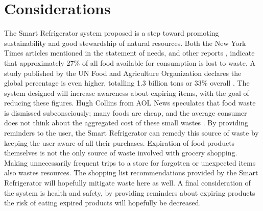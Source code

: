 \documentclass[11pt]{article} %
\begin{document}
\section{Considerations}
The Smart Refrigerator system proposed is a step toward promoting sustainability and good stewardship of natural resources. Both the New York Times articles mentioned in the statement of needs, and other reports \cite{times, aol}, indicate that approximately 27\% of all food available for consumption is lost to waste. A study published by the UN Food and Agriculture Organization declares the global percentage is even higher, totalling 1.3 billion tons or 33\% overall \cite{dutch}. The system designed will increase awareness about expiring items, with the goal of reducing these figures. Hugh Collins from AOL News speculates that food waste is dismissed subconsciously; many foods are cheap, and the average consumer does not think about the aggregated cost of these small wastes \cite{aol}. By providing reminders to the user, the Smart Refrigerator can remedy this source of waste by keeping the user aware of all their purchases. Expiration of food products themselves is not the only source of waste involved with grocery shopping. Making unnecessarily frequent trips to a store for forgotten or unexpected items also wastes resources. The shopping list recommendations provided by the Smart Refrigerator will hopefully mitigate waste here as well. A final consideration of the system is health and safety, by providing reminders about expiring products the risk of eating expired products will hopefully be decreased. 
\end{document}
